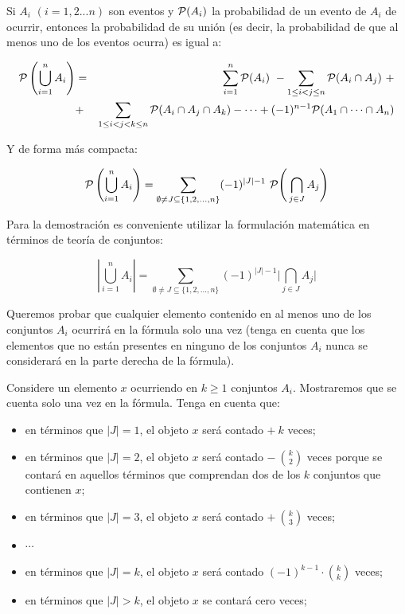 Si $A_i$ $(i = 1,2...n)$ son eventos y ${\cal P}(A_i)$ la probabilidad de un evento de $A_i$ de ocurrir, entonces la probabilidad de su unión (es decir, la probabilidad de que al menos uno de los eventos ocurra) es igual a:

\begin{eqnarray} 
	{\cal P} \left( \bigcup_{i=1}^n A_i \right) &=& \sum_{i=1}^n{\cal P}(A_i)\ - \sum_{1\leq i<j\leq n} {\cal P}(A_i \cap A_j)\ + \\ &+& \sum _{1\leq i<j<k\leq n}{\cal P}(A_i \cap A_j \cap A_k) - \cdots + (-1)^{n-1} {\cal P}( A_1 \cap \cdots \cap A_n ) 
\end{eqnarray}

Y de forma más compacta:


$${\cal P} \left(\bigcup_{i=1}^n A_i \right) = \sum_{\emptyset \neq J\subseteq \{1,2,\ldots,n\}} (-1)^ {|J|-1}\ {\cal P}{\Biggl (}\bigcap_{j\in J}A_{j}{\Biggr )}$$

Para la demostración es conveniente utilizar la formulación matemática en términos de teoría de conjuntos:

$$\left|\bigcup_{i=1}^n A_i \right| = \sum_{\emptyset \neq J\subseteq \{1,2,\ldots ,n\}} (-1)^{|J|-1}{\Biggl |}\bigcap_{j\in J}A_{j}{\Biggr |}$$

Queremos probar que cualquier elemento contenido en al menos uno de los conjuntos $A_i$ ocurrirá en la fórmula solo una vez (tenga en cuenta que los elementos que no están presentes en ninguno de los conjuntos $A_i$ nunca se considerará en la parte derecha de la fórmula).

Considere un elemento $x$ ocurriendo en $k \geq 1$ conjuntos $A_i$. Mostraremos que se cuenta solo una vez en la fórmula. Tenga en cuenta que:

\begin{itemize}
	\item en términos que $|J| = 1$, el objeto $x$ será contado $+\ k$ veces;
	\item en términos que $|J| = 2$, el objeto $x$ será contado $-\ \binom{k}{2}$ veces porque se 
	contará en aquellos términos que comprendan dos de los $k$ conjuntos que contienen $x$;
	\item en términos que $|J| = 3$, el objeto $x$ será contado $+\ \binom{k}{3}$ veces;
	\item $\cdots$
	\item en términos que $|J| = k$, el objeto $x$ será contado $(-1)^{k-1}\cdot\binom{k}{k}$ veces;
	\item en términos que $|J| > k$, el objeto $x$ se contará cero veces;
	
\end{itemize}

